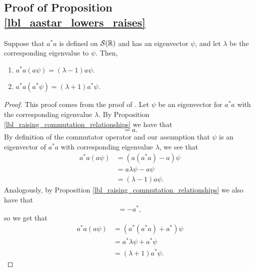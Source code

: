 \subsection{Proof of Proposition \eqref{lbl_aastar_lowers_raises}}\label{proof_lbl_aastar_lowers_raises}

\begin{proposition}
  Suppose that $a^*a$ is defined on $\mathcal{S}(\mathbb{R})$ and has an eigenvector $\psi$, and let $\lambda$ be the corresponding eigenvalue to $\psi$. Then,
  \begin{enumerate}[label=(\alph*)]
    \item $a^*a (a\psi) = (\lambda - 1)a\psi$.
    \item $a^*a (a^* \psi) = (\lambda + 1)a^*\psi$.
  \end{enumerate}
\end{proposition}
\begin{proof}
  This proof comes from the proof of {\cite[Proposition 11.1]{Hall2013}}. Let $\psi$ be an eigenvector for $a^*a$ with the corresponding eigenvalue $\lambda$. By Proposition \eqref{lbl_raising_commutation_relationships} we have that
  \begin{equation*}
    [a, a^*a] = a.
  \end{equation*}
  By definition of the commutator operator and our assumption that $\psi$ is an eigenvector of $a^*a$ with corresponding eigenvalue $\lambda$, we see that
  \begin{align*}
    a^*a(a\psi)
    &= (a(a^* a) - a) \psi \\
    &= a\lambda\psi - a\psi \\
    &= (\lambda - 1)a\psi.
  \end{align*}
  Analogously, by Proposition \eqref{lbl_raising_commutation_relationships} we also have that
  \begin{equation*}
    [a^*, a^*a] = -a^*,
  \end{equation*}
  so we get that
  \begin{align*}
    a^*a (a\psi)
    &= (a^*(a^*a) + a^*)\psi \\
    &= a^*\lambda\psi + a^*\psi \\
    &= (\lambda + 1)a^*\psi.
  \end{align*}
\end{proof}
